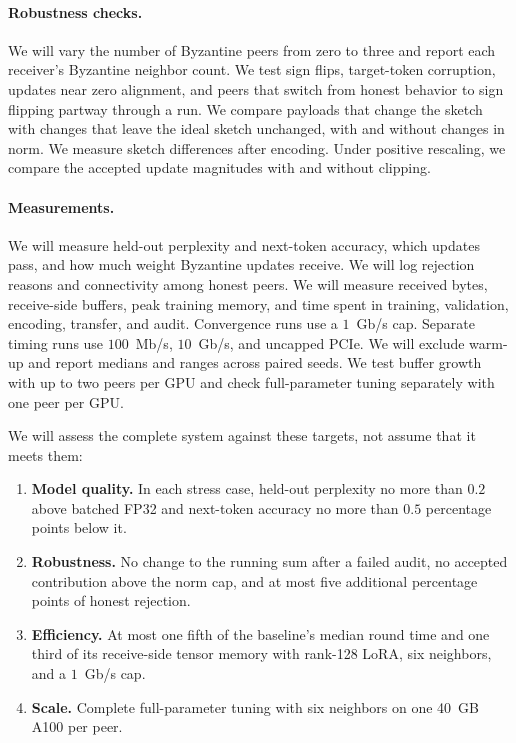 \documentclass{article}
\begin{document}
\paragraph{Robustness checks.} We will vary the number of Byzantine peers from zero to three and report each receiver's Byzantine neighbor count. We test sign flips, target-token corruption, updates near zero alignment, and peers that switch from honest behavior to sign flipping partway through a run. We compare payloads that change the sketch with changes that leave the ideal sketch unchanged, with and without changes in norm. We measure sketch differences after encoding. Under positive rescaling, we compare the accepted update magnitudes with and without clipping.

\paragraph{Measurements.} We will measure held-out perplexity and next-token accuracy, which updates pass, and how much weight Byzantine updates receive. We will log rejection reasons and connectivity among honest peers. We will measure received bytes, receive-side buffers, peak training memory, and time spent in training, validation, encoding, transfer, and audit. Convergence runs use a $1$~Gb/s cap. Separate timing runs use $100$~Mb/s, $10$~Gb/s, and uncapped PCIe. We will exclude warm-up and report medians and ranges across paired seeds. We test buffer growth with up to two peers per GPU and check full-parameter tuning separately with one peer per GPU.

We will assess the complete system against these targets, not assume that it meets them:
\begin{enumerate}
  \item \textbf{Model quality.} In each stress case, held-out perplexity no more than $0.2$ above batched FP32 and next-token accuracy no more than $0.5$ percentage points below it.
  \item \textbf{Robustness.} No change to the running sum after a failed audit, no accepted contribution above the norm cap, and at most five additional percentage points of honest rejection.
  \item \textbf{Efficiency.} At most one fifth of the baseline's median round time and one third of its receive-side tensor memory with rank-128 LoRA, six neighbors, and a $1$~Gb/s cap.
  \item \textbf{Scale.} Complete full-parameter tuning with six neighbors on one 40~GB A100 per peer.
\end{enumerate}
\end{document}
